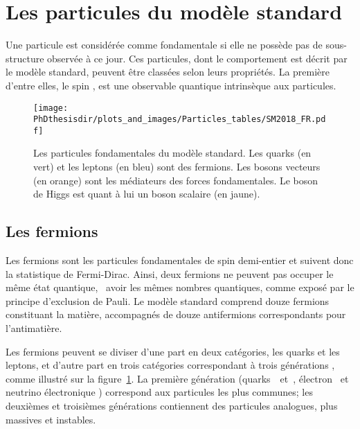 \section{Les particules du modèle standard}\label{chapter-MS-MSSM-section-SM_ptcs}
Une particule est considérée comme fondamentale si elle ne possède pas de sous-structure observée à ce jour. %
Ces particules, dont le comportement est décrit par le modèle standard, peuvent être classées selon leurs propriétés.
La première d'entre elles, le \og spin \fg, est une observable quantique intrinsèque aux particules.
\begin{figure}[h]
\centering
\texttt{[image: \\PhDthesisdir/plots\_and\_images/Particles\_tables/SM2018\_FR.pdf]}
\caption[Les particules fondamentales du modèle standard.]{Les particules fondamentales du modèle standard. Les quarks (en vert) et les leptons (en bleu) sont des fermions. Les bosons vecteurs (en orange) sont les médiateurs des forces fondamentales. Le boson de Higgs est quant à lui un boson scalaire (en jaune).}
\label{fig-MS-table}
\end{figure}

\subsection{Les fermions}\label{chapter-MS-MSSM-section-SM_ptcs-subsec-fermions}
Les fermions sont les particules fondamentales de spin demi-entier et suivent donc la statistique de Fermi-Dirac.
Ainsi, deux fermions ne peuvent pas occuper le même état quantique,
\ie\ avoir les mêmes nombres quantiques,
comme exposé par le principe d'exclusion de Pauli.
Le modèle standard comprend douze fermions constituant la matière, accompagnés de douze antifermions correspondants pour l'antimatière.
\par Les fermions peuvent se diviser d'une part en deux catégories, les quarks et les leptons, et d'autre part en trois catégories correspondant à trois \og générations \fg, comme illustré sur la figure~\ref{fig-MS-table}. La première génération (quarks~\quarku\ et~\quarkd, électron \electron\ et neutrino électronique \nuele) correspond aux particules les plus communes; les deuxièmes et troisièmes générations contiennent des particules analogues, plus massives et instables.

